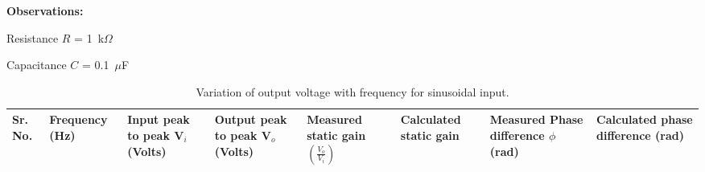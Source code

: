 \documentclass[11pt]{scrreprt}
\begin{document}
\noindent\textbf{Observations:}

Resistance $R$ = 1~k$\Omega$

Capacitance $C$ = 0.1~$\mu$F

\begin{table}[H]
\centering
\caption{Variation of output voltage with frequency for sinusoidal input.}
\begin{tabularx}{\textwidth}{|p{0.5cm}|>{\centering\arraybackslash}X|>{\centering\arraybackslash}X|>{\centering\arraybackslash}X|>{\centering\arraybackslash}X|>{\centering\arraybackslash}X|>{\centering\arraybackslash}X|>{\centering\arraybackslash}X|}
\hline
\textbf{Sr. No.} & \textbf{Frequency (Hz)} & \textbf{Input peak to peak V$_i$ (Volts)} & \textbf{Output peak to peak V$_o$ (Volts)} & \textbf{Measured static gain} $\left( \frac{V_o}{V_i} \right)$ & \textbf{Calculated static gain} & \textbf{Measured Phase difference $\phi$ (rad)} & \textbf{Calculated phase difference (rad)} \\
\hline


\end{tabularx}
\end{table}
\end{document}
